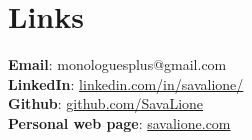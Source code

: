 \documentclass[letterpaper,11pt]{article}
\begin{document}

\section{Links}
\begin{itemize}[leftmargin=0.15in, label={}]
    \normalsize{\item{
                    \textbf{Email}{:  monologuesplus@gmail.com} \\
                    \textbf{LinkedIn}{:  \href{https://linkedin.com/in/savalione/}{linkedin.com/in/savalione/}} \\
                    \textbf{Github}{:  \href{https://github.com/SavaLione}{github.com/SavaLione}} \\
                    \textbf{Personal web page}{: \href{https://savalione.com}{savalione.com} } \\
              }}
\end{itemize}
\end{document}
